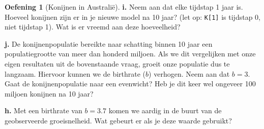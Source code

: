 \documentclass[
  a4paper,
]{scrbook}
\theoremstyle{definition}
\newtheorem{exercise}{Oefening}[chapter]
\theoremstyle{remark}
\begin{document}
\begin{exercise}[Konijnen in
Australië]
\textbf{i.} Neem aan dat elke tijdstap 1 jaar is. Hoeveel konijnen zijn
er in je nieuwe model na 10 jaar? (let op: \texttt{K{[}1{]}} is tijdstap
0, niet tijdstap 1). Wat is er vreemd aan deze hoeveelheid?

\textbf{j.} De konijnenpopulatie bereikte naar schatting binnen 10 jaar
een populatiegrootte van meer dan honderd miljoen. Als we dit
vergelijken met onze eigen resultaten uit de bovenstaande vraag, groeit
onze populatie dus te langzaam. Hiervoor kunnen we de birthrate (\(b\))
verhogen. Neem aan dat \(b=3\). Gaat de konijnenpopulatie naar een
evenwicht? Heb je dit keer wel ongeveer 100 miljoen konijnen na 10 jaar?

\textbf{h.} Met een birthrate van \(b=3.7\) komen we aardig in de buurt
van de geobserveerde groeisnelheid. Wat gebeurt er als je deze waarde
gebruikt?

\end{exercise}
\end{document}
